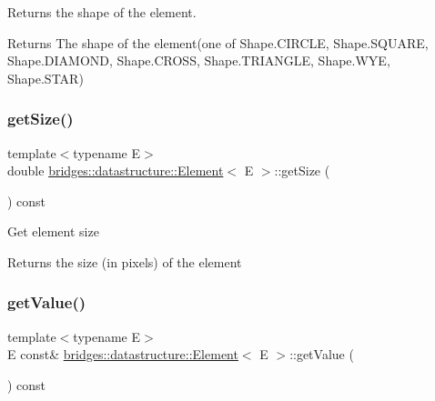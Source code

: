 Returns the shape of the element. 

\begin{DoxyReturn}{Returns}
The shape of the element(one of Shape.\+C\+I\+R\+C\+LE, Shape.\+S\+Q\+U\+A\+RE, Shape.\+D\+I\+A\+M\+O\+ND, Shape.\+C\+R\+O\+SS, Shape.\+T\+R\+I\+A\+N\+G\+LE, Shape.\+W\+YE, Shape.\+S\+T\+AR) 
\end{DoxyReturn}
\mbox{\label{classbridges_1_1datastructure_1_1_element_a8c0b15450978b03c8ebf6a3c23092cba}} 
\subsubsection{\texorpdfstring{get\+Size()}{getSize()}}
{\footnotesize\ttfamily template$<$typename E$>$ \\
double \hyperlink{classbridges_1_1datastructure_1_1_element}{bridges\+::datastructure\+::\+Element}$<$ E $>$\+::get\+Size (\begin{DoxyParamCaption}{ }\end{DoxyParamCaption}) const\hspace{0.3cm}{\ttfamily [inline]}}

Get element size \begin{DoxyReturn}{Returns}
the size (in pixels) of the element 
\end{DoxyReturn}
\mbox{\label{classbridges_1_1datastructure_1_1_element_acf6e068c6b00ff0d20ed42af32ff1f38}} 
\subsubsection{\texorpdfstring{get\+Value()}{getValue()}\hspace{0.1cm}{\footnotesize\ttfamily [1/2]}}
{\footnotesize\ttfamily template$<$typename E$>$ \\
E const\& \hyperlink{classbridges_1_1datastructure_1_1_element}{bridges\+::datastructure\+::\+Element}$<$ E $>$\+::get\+Value (\begin{DoxyParamCaption}{ }\end{DoxyParamCaption}) const\hspace{0.3cm}{\ttfamily [inline]}}

